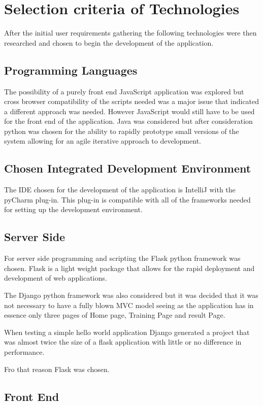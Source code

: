\section{Selection criteria of Technologies}
After the initial user requirements gathering the following technologies were then researched and chosen to begin the development of the application.

\subsection{Programming Languages}
The possibility of a purely front end JavaScript application was explored but cross browser compatibility of the scripts needed was a major issue that indicated a different approach was needed. However JavaScript would still have to be used for the front end of the application.
Java was considered but after consideration python was chosen for the ability to rapidly prototype small versions of the system allowing for an agile iterative approach to development.
\subsection{Chosen Integrated Development Environment}
The IDE chosen for the development of the application is IntelliJ with the pyCharm plug-in. This plug-in is compatible with all of the frameworks needed for setting up the development environment.
\subsection{Server Side}
For server side programming and scripting the Flask python framework was chosen. Flask is a light weight package that allows for the rapid deployment and development of web applications.

The Django python framework was also considered but it was decided that it was not necessary to have a fully blown MVC model seeing as the application has in essence only three pages of Home page, Training Page and result Page.

When testing a simple hello world application Django generated a project that was almost twice the size of a flask application with little or no difference in performance.

Fro that reason Flask was chosen. 
\subsection{Front End}

